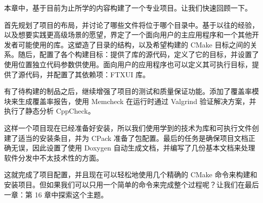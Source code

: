 本章中，基于目前为止所学的内容构建了一个专业项目。让我们快速回顾一下。

首先规划了项目的布局，并讨论了哪些文件将位于哪个目录中。基于以往的经验，以及想要实践更高级场景的愿望，界定了一个面向用户的主应用程序和一个其他开发者可能使用的库。这塑造了目录的结构，以及希望构建的 CMake 目标之间的关系。随后，配置了各个构建目标：提供了库的源代码，定义了它的目标，并设置了使用位置独立代码参数供使用。面向用户的应用程序也可以定义其可执行目标，提供了源代码，并配置了其依赖项：FTXUI 库。

有了待构建的制品之后，继续增强了项目的测试和质量保证功能。添加了覆盖率模块来生成覆盖率报告，使用 Memcheck 在运行时通过 Valgrind 验证解决方案，并执行了静态分析 CppCheck。

这样一个项目现在已经准备好安装，所以我们使用学到的技术为库和可执行文件创建了适当的安装条目，并为 CPack 准备了包配置。最后的任务是确保项目文档正确无误，因此设置了使用 Doxygen 自动生成文档，并编写了几份基本文档来处理软件分发中不太技术性的方面。

这就完成了项目配置，并且现在可以轻松地使用几个精确的 CMake 命令来构建和安装项目。但如果我们可以只用一个简单的命令来完成整个过程呢？让我们在最后一章：第 16 章中探索这个主题。